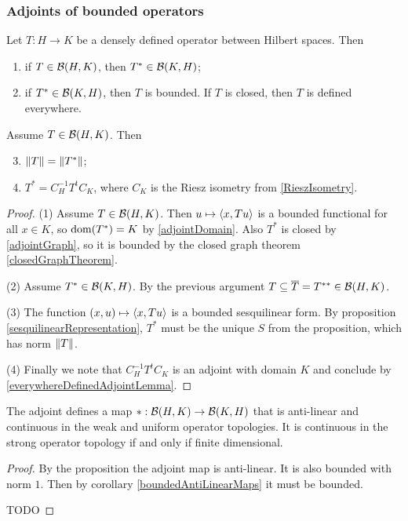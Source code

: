 \subsubsection{Adjoints of bounded operators}
\begin{proposition}
Let $T: H\to K$ be a densely defined operator between Hilbert spaces. Then
\begin{enumerate}
\item if $T\in\operatorname{\mathcal{B}}(H,K)$, then $T^*\in\operatorname{\mathcal{B}}(K,H)$;
\item if $T^*\in\operatorname{\mathcal{B}}(K,H)$, then $T$ is bounded. If $T$ is closed, then $T$ is defined everywhere.
\end{enumerate}
Assume $T\in\operatorname{\mathcal{B}}(H,K)$. Then
\begin{enumerate} \setcounter{enumi}{2}
\item $\lVert T\rVert = \lVert T^*\rVert$;
\item $T^* = C_H^{-1}T^tC_K$, where $C_K$ is the Riesz isometry from \ref{RieszIsometry}.
\end{enumerate}
\end{proposition}
\begin{proof}
(1) Assume $T\in\operatorname{\mathcal{B}}(H,K)$. Then $u\mapsto \left\langle x,Tu \right\rangle$ is a bounded functional for all $x\in K$, so $\operatorname{dom}(T^*) = K$ by \ref{adjointDomain}. Also $T^*$ is closed by \ref{adjointGraph}, so it is bounded by the closed graph theorem \ref{closedGraphTheorem}.

(2) Assume $T^*\in\operatorname{\mathcal{B}}(K,H)$. By the previous argument $T \subseteq \overline{T} = T^{**}\in\operatorname{\mathcal{B}}(H,K)$.

(3) The function $(x,u)\mapsto \left\langle x,Tu \right\rangle$ is a bounded sesquilinear form. By proposition \ref{sesquilinearRepresentation}, $T^*$ must be the unique $S$ from the proposition, which has norm $\lVert T\rVert$.

(4) Finally we note that $C_H^{-1}T^tC_K$ is an adjoint with domain $K$ and conclude by \ref{everywhereDefinedAdjointLemma}.
\end{proof}

\begin{lemma}
The adjoint defines a map $*:\operatorname{\mathcal{B}}(H,K)\to \operatorname{\mathcal{B}}(K,H)$ that is anti-linear and continuous in the weak and uniform operator topologies. It is continuous in the strong operator topology \textup{if and only if} finite dimensional.
\end{lemma}
\begin{proof}
By the proposition the adjoint map is anti-linear. It is also bounded with norm $1$. Then by corollary \ref{boundedAntiLinearMaps} it must be bounded.

TODO
\end{proof}

